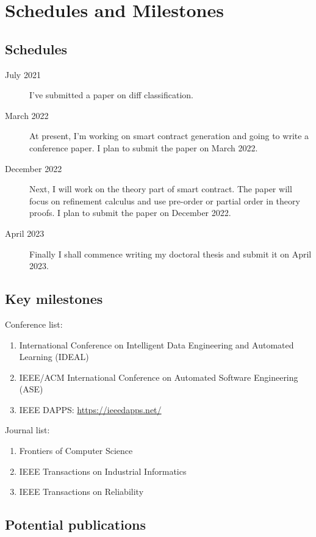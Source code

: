 \chapter{Schedules and Milestones}

\section{Schedules}


\begin{description}
   \item[July 2021]  I've submitted a paper on diff classification.
   \item[March 2022] At present, I'm working on smart contract generation and going to write a conference paper. I plan to submit the paper on March 2022.
   \item[December 2022]  Next, I will work on the theory part of smart contract. The paper will focus on refinement calculus and use pre-order or partial order in theory proofs. I plan to submit the paper on December 2022.
   \item[April 2023] Finally I shall commence writing my doctoral thesis and submit it on April 2023.
\end{description}


\section{Key milestones}

Conference list:
\begin{enumerate}
\item International Conference on Intelligent Data Engineering and Automated Learning (IDEAL)
\item IEEE/ACM International Conference on Automated Software Engineering (ASE)
\item IEEE DAPPS: \url{https://ieeedapps.net/}
\end{enumerate}

Journal list:
\begin{enumerate}
\item Frontiers of Computer Science
\item IEEE Transactions on Industrial Informatics
\item IEEE Transactions on Reliability
\end{enumerate}

\section{Potential publications}

